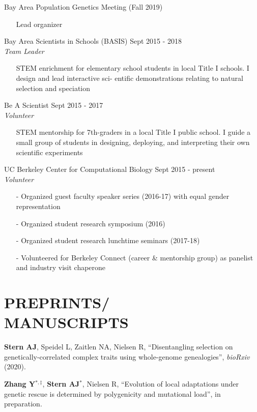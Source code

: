 \documentclass[margin, 10pt]{res} %
\begin{document}
\begin{resume}
Bay Area Population Genetics Meeting (Fall 2019)\\
\begin{itemize}
\item[] Lead organizer
\end{itemize} 
Bay Area Scientists in Schools (BASIS) \hfill Sept 2015 - 2018\\
{\sl Team Leader}
\begin{itemize}
\item[] STEM enrichment for elementary school students in local Title I schools. I design and lead interactive sci- entific demonstrations relating to natural selection and speciation
\end{itemize} 
Be A Scientist \hfill Sept 2015 - 2017\\
{\sl Volunteer}
\begin{itemize}
\item[] STEM mentorship for 7th-graders in a local Title I public school. I guide a small group of students in designing, deploying, and interpreting their own scientific experiments
\end{itemize} 
UC Berkeley Center for Computational Biology \hfill Sept 2015 - present\\
{\sl Volunteer}
\begin{itemize}
\item[-] Organized guest faculty speaker series (2016-17) with equal gender representation
\item[-] Organized student research symposium (2016)
\item[-] Organized student research lunchtime seminars (2017-18)
\item[-] Volunteered for Berkeley Connect (career \& mentorship group) as panelist and industry visit chaperone
\end{itemize}


\section{PREPRINTS/\\MANUSCRIPTS}

{\bf Stern AJ}, Speidel L, Zaitlen NA, Nielsen R, ``Disentangling selection on genetically-correlated complex traits using whole-genome genealogies'', {\it bioRxiv} (2020).

{\bf Zhang Y}$^{*,\ddag}$, {\bf Stern AJ}$^{*}$, Nielsen R, ``Evolution of local adaptations under genetic rescue is determined by polygenicity and mutational load'', in preparation.


\end{resume}
\end{document}
